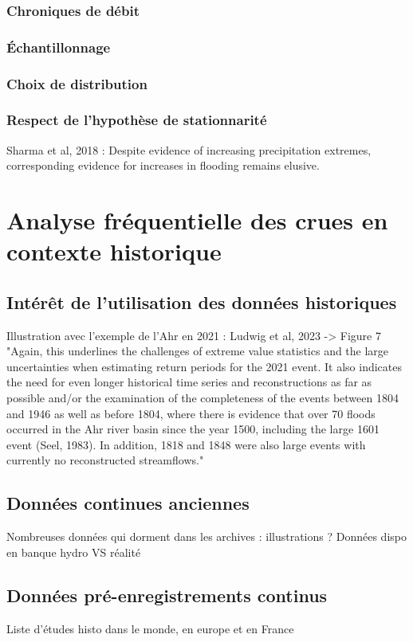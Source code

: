 \documentclass[11pt]{article}
\begin{document}
			\subsubsection{Chroniques de débit}
			\subsubsection{Échantillonnage}
			\subsubsection{Choix de distribution}
			\subsubsection{Respect de l'hypothèse de stationnarité}
			
Sharma et al, 2018 : Despite evidence of increasing precipitation extremes, corresponding evidence for increases in flooding remains elusive. 
		
\section{Analyse fréquentielle des crues en contexte historique}
		\subsection{Intérêt de l'utilisation des données historiques}
		
		Illustration avec l'exemple de l'Ahr en 2021 : Ludwig et al, 2023 -> Figure 7
		"Again, this underlines the challenges of extreme value
statistics and the large uncertainties when estimating return
periods for the 2021 event. It also indicates the need for
even longer historical time series and reconstructions as far
as possible and/or the examination of the completeness of
the events between 1804 and 1946 as well as before 1804,
where there is evidence that over 70 floods occurred in the
Ahr river basin since the year 1500, including the large 1601
event (Seel, 1983). In addition, 1818 and 1848 were also
large events with currently no reconstructed streamflows."
		
		\subsection{Données continues anciennes}
		Nombreuses données qui dorment dans les archives : illustrations ? Données dispo en banque hydro VS réalité
		\subsection{Données pré-enregistrements continus}
		Liste d'études histo dans le monde, en europe et en France
\end{document}
